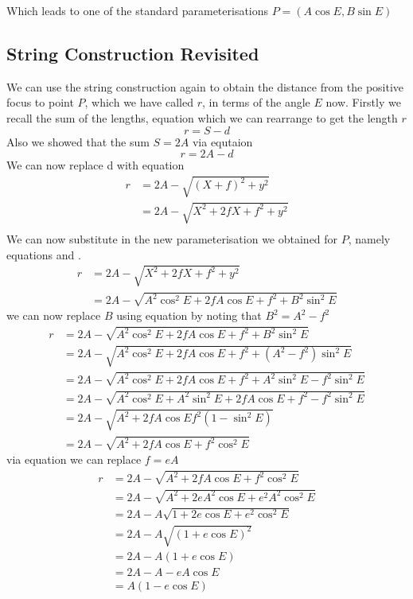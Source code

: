 Which leads to one of the standard parameterisations $P=(A \cos E, B \sin E)$

\subsection{String Construction Revisited}

We can use the string construction again to obtain the distance from the positive
focus to point $P$, which we have called $r$, in terms of the angle $E$ now. Firstly
we recall the sum of the lengths, equation  which we can rearrange
to get the length $r$
\begin{equation}
r = S - d
\end{equation}
Also we showed that the sum $S = 2A$ via equtaion 
\begin{equation}
r = 2A - d
\end{equation}
We can now replace d with equation 
\begin{align}
r &= 2A - \sqrt{(X+f)^2+y^2} \nonumber \\
&= 2A - \sqrt{X^2+2fX+f^2+y^2} \nonumber \\
\end{align}
We can now substitute in the new parameterisation we obtained for $P$, namely equations  and .
\begin{align}
r &= 2A - \sqrt{X^2+2fX+f^2+y^2} \nonumber \\
&= 2A - \sqrt{A^2\cos^2 E +2fA \cos E +f^2+B^2\sin^2 E}
\end{align}
we can now replace $B$ using equation  
by noting that $B^2=A^2-f^2$
\begin{align}
r &= 2A - \sqrt{A^2\cos^2 E +2fA \cos E +f^2+B^2\sin^2 E} \nonumber \\
&= 2A - \sqrt{A^2\cos^2 E +2fA \cos E +f^2+(A^2-f^2)\sin^2 E} \nonumber \\
&= 2A - \sqrt{A^2\cos^2 E +2fA \cos E +f^2+A^2 \sin^2 E-f^2 \sin^2 E} \nonumber \\
&= 2A - \sqrt{A^2\cos^2 E +A^2 \sin^2 E+2fA \cos E +f^2-f^2 \sin^2 E} \nonumber \\
&= 2A - \sqrt{A^2 +2fA \cos E f^2(1- \sin^2 E)}\nonumber \\
&= 2A - \sqrt{A^2 +2fA \cos E +f^2\cos^2 E}
\end{align}
via equation  we can replace $f=eA$
\begin{align}
r &= 2A - \sqrt{A^2 +2fA \cos E +f^2\cos^2 E} \nonumber \\
&= 2A - \sqrt{A^2 +2eA^2 \cos E +e^2A^2\cos^2 E} \nonumber \\
&= 2A - A\sqrt{1 +2e\cos E +e^2\cos^2 E} \nonumber \\
&= 2A - A\sqrt{(1 +e\cos E)^2} \nonumber \\
&= 2A - A(1 +e\cos E) \nonumber \\
&= 2A - A - eA\cos E \nonumber \\
&= A(1- e\cos E) \label{eq:geom-radius}
\end{align}

